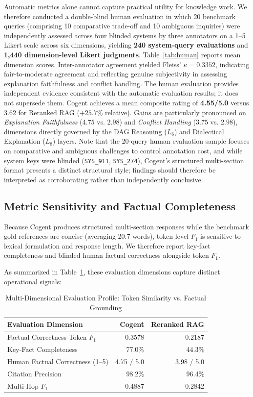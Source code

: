 \documentclass[journal,compsoc]{IEEEtran}
\begin{document}
Automatic metrics alone cannot capture practical utility for knowledge work. We therefore conducted a double-blind human evaluation in which 20 benchmark queries (comprising 10 comparative trade-off and 10 ambiguous inquiries) were independently assessed across four blinded systems by three annotators on a 1--5 Likert scale across six dimensions, yielding \textbf{240 system-query evaluations} and \textbf{1,440 dimension-level Likert judgments}. Table~\ref{tab:human} reports mean dimension scores. Inter-annotator agreement yielded Fleiss' $\kappa = 0.3352$, indicating fair-to-moderate agreement and reflecting genuine subjectivity in assessing explanation faithfulness and conflict handling. The human evaluation provides independent evidence consistent with the automatic evaluation results; it does not supersede them. Cogent achieves a mean composite rating of \textbf{4.55/5.0} versus 3.62 for Reranked RAG ($+25.7\%$ relative). Gains are particularly pronounced on \textit{Explanation Faithfulness} ($4.75$ vs. $2.98$) and \textit{Conflict Handling} ($3.75$ vs. $2.98$), dimensions directly governed by the DAG Reasoning ($L_6$) and Dialectical Explanation ($L_8$) layers. Note that the 20-query human evaluation sample focuses on comparative and ambiguous challenges to control annotation cost, and while system keys were blinded (\texttt{SYS\_911}, \texttt{SYS\_274}), Cogent's structured multi-section format presents a distinct structural style; findings should therefore be interpreted as corroborating rather than independently conclusive.

\subsection{Metric Sensitivity and Factual Completeness}
\label{sec:metric_sensitivity}
Because Cogent produces structured multi-section responses while the benchmark gold references are concise (averaging 20.7 words), token-level $F_1$ is sensitive to lexical formulation and response length. We therefore report key-fact completeness and blinded human factual correctness alongside token $F_1$.

As summarized in Table~\ref{tab:multidim}, these evaluation dimensions capture distinct operational signals:
\begin{table}[!t]
\centering
\caption{Multi-Dimensional Evaluation Profile: Token Similarity vs. Factual Grounding}
\label{tab:multidim}
\begin{tabular}{lrr}
\toprule
Evaluation Dimension & Cogent & Reranked RAG \\
\midrule
Factual Correctness Token $F_1$ & 0.3578 & 0.2187 \\
Key-Fact Completeness & 77.0\% & 44.3\% \\
Human Factual Correctness (1--5) & 4.75 / 5.0 & 3.98 / 5.0 \\
Citation Precision & 98.2\% & 96.4\% \\
Multi-Hop $F_1$ & 0.4887 & 0.2842 \\
\bottomrule
\end{tabular}
\end{table}
\end{document}
